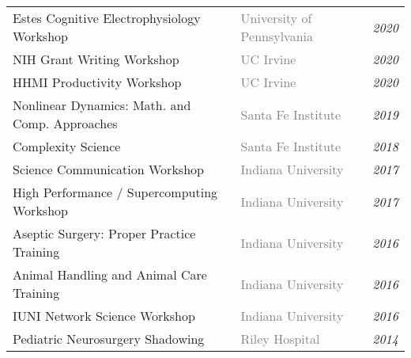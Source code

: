 \documentclass[10pt]{cooperCV2}
\begin{document}
\begin{longtable}{@{} l l @{\extracolsep{\fill}}  l @{}} 
	 
	Estes Cognitive Electrophysiology Workshop & \textcolor{gray}{University of Pennsylvania}  & \textit{2020} \\
	 
	NIH Grant Writing Workshop & \textcolor{gray}{UC Irvine}  & \textit{2020} \\
	 
	HHMI Productivity Workshop & \textcolor{gray}{UC Irvine}  & \textit{2020} \\
	 
	Nonlinear Dynamics: Math. and Comp. Approaches & \textcolor{gray}{Santa Fe Institute}  & \textit{2019} \\
	 
	Complexity Science & \textcolor{gray}{Santa Fe Institute}  & \textit{2018} \\
	 
	Science Communication Workshop & \textcolor{gray}{Indiana University}  & \textit{2017} \\
	 
	High Performance / Supercomputing Workshop & \textcolor{gray}{Indiana University}  & \textit{2017} \\
	 
	Aseptic Surgery: Proper Practice Training & \textcolor{gray}{Indiana University}  & \textit{2016} \\
	 
	Animal Handling and Animal Care Training & \textcolor{gray}{Indiana University}  & \textit{2016} \\
	 
	IUNI Network Science Workshop & \textcolor{gray}{Indiana University}  & \textit{2016} \\
	 
	Pediatric Neurosurgery Shadowing & \textcolor{gray}{Riley Hospital}  & \textit{2014} \\
	
\end{longtable}








%	
\end{document}
